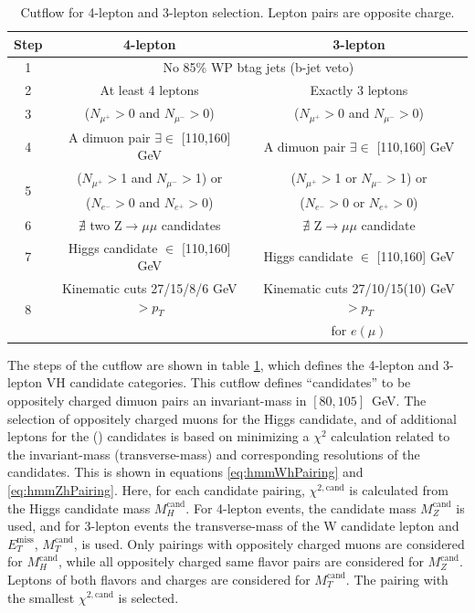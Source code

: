 \begin{table}[ht!]
 \caption{Cutflow for 4-lepton and 3-lepton selection. Lepton pairs are opposite charge.}
 \begin{center}
\begin{tabular}{c c  c}\toprule
Step & 4-lepton & 3-lepton \\\midrule
1 & \multicolumn{2}{c}{No 85\% WP btag jets (b-jet veto)}           \\\midrule
2 & At least 4 leptons                                & Exactly 3 leptons\\\midrule
3 & ($N_{\mu^+}>$0 and $N_{\mu^-}>$0)                 & ($N_{\mu^+}>$0 and $N_{\mu^-}>$0) \\\midrule
4 & A dimuon pair $\exists\in$ [110,160] GeV                    & A dimuon pair $\exists\in$ [110,160] GeV \\\midrule
\multirow{2}{*}{5} & ($N_{\mu^+}>$1 and $N_{\mu^-}>$1) or              & ($N_{\mu^+}>$1 or $N_{\mu^-}>$1) or \\
  & ($N_{e^-}>$0 and $N_{e^+}>$0)                    & ($N_{e^-}>$0 or $N_{e^+}>$0)  \\\midrule
6 & $\nexists$ two Z$\to\mu\mu$ candidates                        & $\nexists$ Z$\to\mu\mu$ candidate  \\\midrule
7 & Higgs candidate $\in$ [110,160] GeV                  & Higgs candidate $\in$ [110,160] GeV \\\midrule
\multirow{2}{*}{8} & Kinematic cuts 27/15/8/6 GeV $>p_T$                    & Kinematic cuts 27/10/15(10) GeV $>p_T$ \\
  &                                                        & for $e(\mu)$ \\
\bottomrule\end{tabular}
 \end{center}
\label{tab:hmmEv}
\end{table}

The steps of the cutflow are shown in table \ref{tab:hmmEv}, which defines the 4-lepton and 3-lepton VH candidate categories.
This cutflow defines ``\Z candidates'' to be oppositely charged dimuon pairs an invariant-mass in $[80,105]$~GeV.
The selection of oppositely charged muons for the Higgs candidate, and of additional leptons for the \Z(\W) candidates is based on minimizing a $\chi^2$ calculation related to the invariant-mass (transverse-mass) and corresponding resolutions of the candidates.
This is shown in equations \ref{eq:hmmWhPairing} and \ref{eq:hmmZhPairing}.
Here, for each candidate pairing, $\chi^{2,\text{cand}}$ is calculated from the Higgs candidate mass $M_H^\text{cand}$.
For 4-lepton events, the \Z candidate mass $M_Z^\text{cand}$ is used, and for 3-lepton events the transverse-mass of the W candidate lepton and $E_T^\text{miss}$, $M_T^\text{cand}$, is used.
Only pairings with oppositely charged muons are considered for $M_H^\text{cand}$, while all oppositely charged same flavor pairs are considered for $M_Z^\text{cand}$.
Leptons of both flavors and charges are considered for $M_T^\text{cand}$.
The pairing with the smallest $\chi^{2,\text{cand}}$ is selected.

